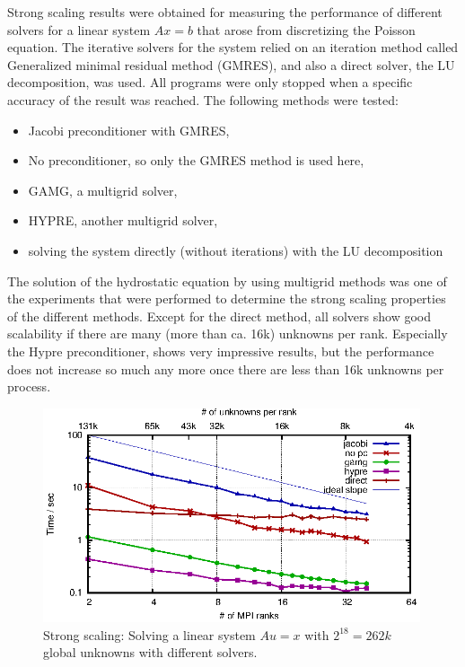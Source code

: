Strong scaling results were obtained for measuring the performance of different solvers for a linear system $Ax = b$ that arose from discretizing the Poisson equation. The iterative solvers for the system relied on an iteration method called Generalized minimal residual method (GMRES), and also a direct solver, the LU decomposition, was used. All programs were only stopped when a specific accuracy of the result was reached. The following methods were tested:
\begin{itemize}
\item Jacobi preconditioner with GMRES,
\item No preconditioner, so only the GMRES method is used here,
\item GAMG, a multigrid solver,
\item HYPRE, another multigrid solver,
\item solving the system directly (without iterations) with the LU decomposition
\end{itemize}


The solution of the hydrostatic equation by using multigrid methods was one of the experiments that were performed to determine the strong scaling properties of the different methods. Except for the direct method, all solvers show good scalability if there are many (more than ca. 16k) unknowns per rank. Especially  the Hypre \cite{hypre-web-page} preconditioner, shows very impressive results, but the performance does not increase so much any more once there are less than 16k unknowns per process. 


\begin{figure}[tb]
	\centering
	\includegraphics[width=0.99\textwidth]{ex2_times}
	\caption{Strong scaling: Solving a linear system $Au = x$ with $2^{18} = 262k$ global unknowns with different solvers.} 
	\label{fig:res_ex2_strong_time}
\end{figure}




